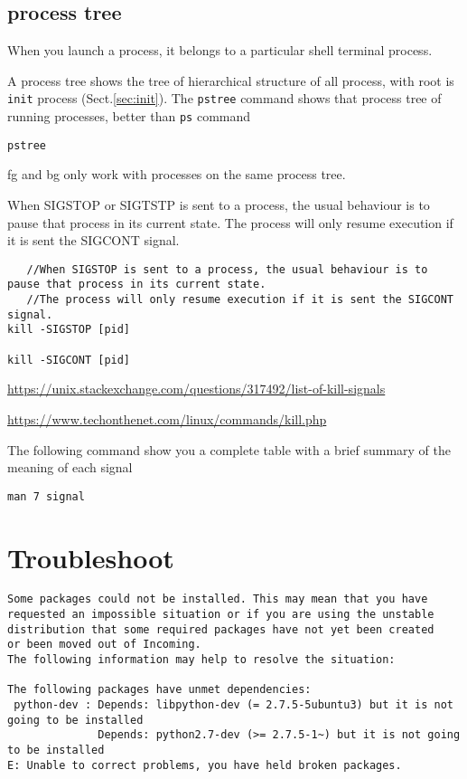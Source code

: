 \subsection{process tree}
\label{sec:process-tree}

When you launch a process, it belongs to a particular shell terminal process.

A process tree shows the tree of hierarchical structure of all process, with
root is \verb!init! process (Sect.\ref{sec:init}). The \verb!pstree! command
shows that process tree of running processes, better than \verb!ps! command
\begin{verbatim}
pstree
\end{verbatim}

fg and bg only work with processes on the same process tree. 


When SIGSTOP or SIGTSTP is sent to a process, the usual behaviour is to pause
that process in its current state. The process will only resume execution if it
is sent the SIGCONT signal.
\begin{verbatim}
   //When SIGSTOP is sent to a process, the usual behaviour is to pause that process in its current state. 
   //The process will only resume execution if it is sent the SIGCONT signal.
kill -SIGSTOP [pid]

kill -SIGCONT [pid]
\end{verbatim}
\url{https://unix.stackexchange.com/questions/317492/list-of-kill-signals}

\url{https://www.techonthenet.com/linux/commands/kill.php}

The following command show you a complete table with a brief summary of the
meaning of each signal

\begin{verbatim}
man 7 signal
\end{verbatim}


\section{Troubleshoot}

\begin{verbatim}
Some packages could not be installed. This may mean that you have
requested an impossible situation or if you are using the unstable
distribution that some required packages have not yet been created
or been moved out of Incoming.
The following information may help to resolve the situation:

The following packages have unmet dependencies:
 python-dev : Depends: libpython-dev (= 2.7.5-5ubuntu3) but it is not going to be installed
              Depends: python2.7-dev (>= 2.7.5-1~) but it is not going to be installed
E: Unable to correct problems, you have held broken packages.
\end{verbatim}

